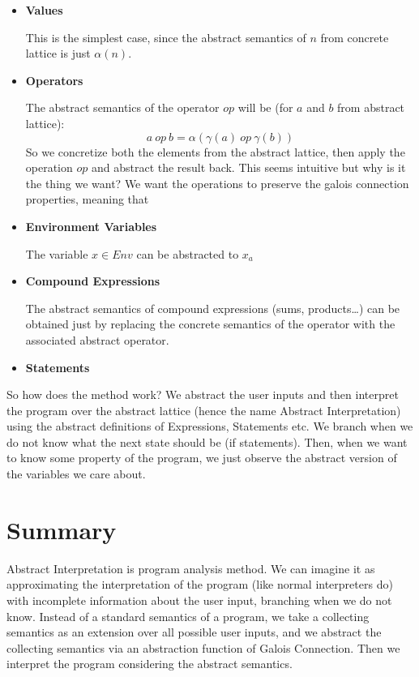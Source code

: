 \begin{itemize}
    \item \textbf{Values}

    This is the simplest case, since the abstract semantics of $n$ from concrete lattice is just $\alpha(n)$.

    \item \textbf{Operators}

    The abstract semantics of the operator $op$ will be (for $a$ and $b$ from abstract lattice):
    \[a \: op \: b = \alpha(\gamma(a) \: op \: \gamma(b))\]
    So we concretize both the elements from the abstract lattice, then apply the operation $op$ and abstract the result
    back.
    This seems intuitive but why is it the thing we want?
    We want the operations to preserve the galois connection properties, meaning that 


    \item \textbf{Environment Variables}

    The variable $x \in Env$ can be abstracted to $x_a$
    \item \textbf{Compound Expressions}

    The abstract semantics of compound expressions (sums, products\ldots) can be obtained just by replacing the
    concrete semantics of the operator with the associated abstract operator.

    \item \textbf{Statements}
\end{itemize}

So how does the method work?
We abstract the user inputs and then interpret the program over the abstract lattice (hence the name Abstract
Interpretation) using the abstract definitions of Expressions, Statements etc.
We branch when we do not know what the next state should be (if statements).
Then, when we want to know some property of the program, we just observe the abstract version of the variables we care
about.

\section*{Summary}

Abstract Interpretation is program analysis method.
We can imagine it as approximating the interpretation of the program (like normal interpreters do) with incomplete
information about the user input, branching when we do not know.
Instead of a standard semantics of a program, we take a collecting semantics as an extension over all possible user inputs,
and we abstract the collecting semantics via an abstraction function of Galois Connection.
Then we interpret the program considering the abstract semantics.
